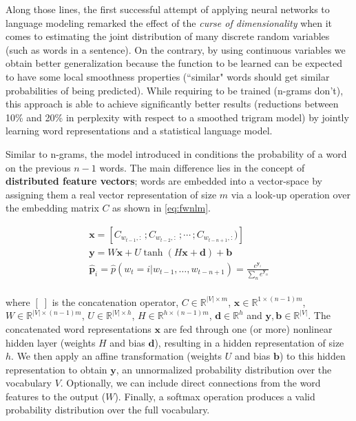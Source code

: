 Along those lines, the first successful attempt of applying neural networks to language modeling \cite{bengio2003neural} remarked the effect of the \textit{curse of dimensionality} when it comes to estimating the joint distribution of many discrete random variables (such as words in a sentence). On the contrary, by using continuous variables we obtain better generalization because the function to be learned can be expected to have some local smoothness properties (``similar" words should get similar probabilities of being predicted). While requiring to be trained (n-grams don't), this approach is able to achieve significantly better results (reductions between 10\% and 20\% in perplexity with respect to a smoothed trigram model) by jointly learning word representations and a statistical language model.

Similar to n-grams, the model introduced in \cite{bengio2003neural} conditions the probability of a word on the previous $n-1$ words. The main difference lies in the concept of \textbf{distributed feature vectors}; words are embedded into a vector-space by assigning them a real vector representation of size $m$ via a look-up operation over the embedding matrix $C$ as shown in \autoref{eq:fwnlm}. 

\begin{equation} \label{eq:fwnlm}
	\begin{gathered}
		\mathbf{x} = [C_{w_{t-1},:} \, ; C_{w_{t-2},:} \, ; \cdots \, ; C_{w_{t-n+1},:})] \\
		\mathbf{y} = W\mathbf{x} + U \tanh(H\mathbf{x}+\mathbf{d}) + \mathbf{b} \\
		\mathbf{\hat{p}}_i=\hat{p}(w_t=i|w_{t-1},\ldots,w_{t-n+1}) = \frac{e^{\mathbf{y}_i}}{\sum_{n}e^{\mathbf{y}_n}} \\
	\end{gathered}
\end{equation}

where $[\;]$ is the concatenation operator, $C \in \mathbb{R}^{|V| \times m}$, $\mathbf{x} \in \mathbb{R}^{1 \times (n-1)m}$, $W \in \mathbb{R}^{|V| \times (n-1)m}$, $U \in \mathbb{R}^{|V| \times h}$, $H \in \mathbb{R}^{h \times (n-1)m}$, $\mathbf{d} \in \mathbb{R}^{h}$ and $\mathbf{y} ,\mathbf{b} \in \mathbb{R}^{|V|}$. The concatenated word representations $\mathbf{x}$ are fed through one (or more) nonlinear hidden layer (weights $H$ and bias $\mathbf{d}$), resulting in a hidden representation of size $h$. We then apply an affine transformation (weights $U$ and bias $\mathbf{b}$) to this hidden representation to obtain $\mathbf{y}$, an unnormalized probability distribution over the vocabulary $V$. Optionally, we can include direct connections from the word features to the output ($W$). Finally, a softmax operation produces a valid probability distribution over the full vocabulary.

